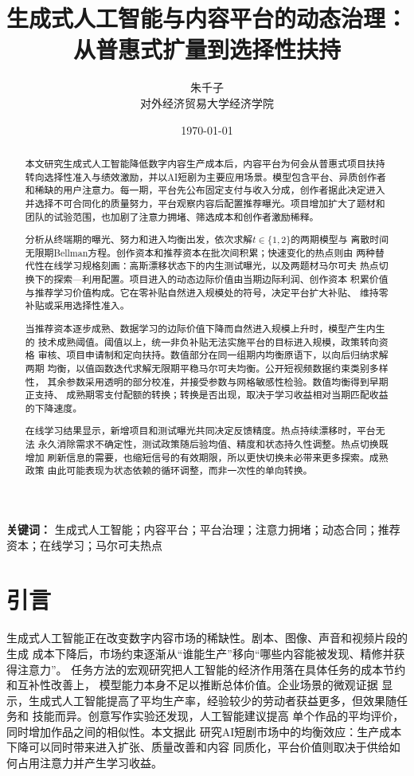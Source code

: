 \documentclass[UTF8, a4paper, 12pt, fontset=fandol]{ctexart}
\title{生成式人工智能与内容平台的动态治理：从普惠式扩量到选择性扶持}
\author{朱千子\\[0.5em]\small 对外经济贸易大学经济学院}
\date{\today}
\theoremstyle{definition}
\theoremstyle{remark}
\begin{document}
\maketitle

\begin{abstract}
本文研究生成式人工智能降低数字内容生产成本后，内容平台为何会从普惠式项目扶持
转向选择性准入与绩效激励，并以AI短剧为主要应用场景。模型包含平台、异质创作者
和稀缺的用户注意力。每一期，平台先公布固定支付与收入分成，创作者据此决定进入
并选择不可合同化的质量努力，平台观察内容后配置推荐曝光。项目增加扩大了题材和
团队的试验范围，也加剧了注意力拥堵、筛选成本和创作者激励稀释。

分析从终端期的曝光、努力和进入均衡出发，依次求解$t\in\{1,2\}$的两期模型与
离散时间无限期Bellman方程。创作资本和推荐资本在批次间积累；快速变化的热点则由
两种替代性在线学习规格刻画：高斯漂移状态下的内生测试曝光，以及两题材马尔可夫
热点切换下的探索---利用配置。项目进入的动态边际价值由当期边际利润、创作资本
积累价值与推荐学习价值构成。它在零补贴自然进入规模处的符号，决定平台扩大补贴、
维持零补贴或采用选择性准入。

当推荐资本逐步成熟、数据学习的边际价值下降而自然进入规模上升时，模型产生内生的
技术成熟阈值。阈值以上，统一非负补贴无法实施平台的目标进入规模，政策转向资格
审核、项目申请制和定向扶持。数值部分在同一组期内均衡原语下，以向后归纳求解两期
均衡，以值函数迭代求解无限期平稳马尔可夫均衡。公开短视频数据约束类别多样性，
其余参数采用透明的部分校准，并接受参数与网格敏感性检验。数值均衡得到早期正支持、
成熟期零支付配额的转换；转换是否出现，取决于学习收益相对当期匹配收益的下降速度。

在线学习结果显示，新增项目和测试曝光共同决定反馈精度。热点持续漂移时，平台无法
永久消除需求不确定性，测试政策随后验均值、精度和状态持久性调整。热点切换既增加
刷新信息的需要，也缩短信号的有效期限，所以更快切换未必带来更多探索。成熟政策
由此可能表现为状态依赖的循环调整，而非一次性的单向转换。
\end{abstract}

\begin{center}
\textbf{关键词：} 生成式人工智能；内容平台；平台治理；注意力拥堵；动态合同；推荐资本；在线学习；马尔可夫热点
\end{center}

\section{引言}
\label{sec:intro}

生成式人工智能正在改变数字内容市场的稀缺性。剧本、图像、声音和视频片段的生成
成本下降后，市场约束逐渐从“谁能生产”移向“哪些内容能被发现、精修并获得注意力”。
任务方法的宏观研究把人工智能的经济作用落在具体任务的成本节约和互补性改善上，
模型能力本身不足以推断总体价值\citep{acemoglu2025simpleai}。企业场景的微观证据
显示，生成式人工智能提高了平均生产率，经验较少的劳动者获益更多，但效果随任务和
技能而异\citep{brynjolfsson2025genaiwork}。创意写作实验还发现，人工智能建议提高
单个作品的平均评价，同时增加作品之间的相似性\citep{doshi2024creativity}。本文据此
研究AI短剧市场中的均衡效应：生产成本下降可以同时带来进入扩张、质量改善和内容
同质化，平台价值则取决于供给如何占用注意力并产生学习收益。
\end{document}
